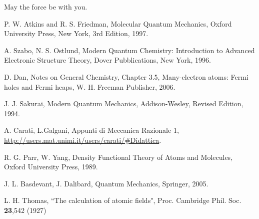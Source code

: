 \documentclass[a4paper,12pt]{article}
\begin{document}
May the force be with you.



\clearpage
{}
\begin{thebibliography}{9}


%
%

P. W. Atkins and R. S. Friedman,
Molecular Quantum Mechanics,
Oxford University Press, New York,
3rd Edition,
1997.

A. Szabo, N. S. Ostlund,
Modern Quantum Chemistry: Introduction to Advanced Electronic Structure Theory,
Dover Pubblications, New York,
1996.

D. Dan, Notes on General Chemistry,
Chapter 3.5, Many-electron atoms: Fermi holes and Fermi heaps,
W. H. Freeman Publisher,
2006.

J. J. Sakurai,
Modern Quantum Mechanics,
Addison-Wesley,
Revised Edition,
1994.

A. Carati, L.Galgani,
Appunti di Meccanica Razionale 1,
\url{http://users.mat.unimi.it/users/carati/#Didattica}.

R. G. Parr, W. Yang,
Density Functional Theory of Atoms and Molecules,
Oxford University Press,
1989.

J. L. Basdevant, J. Dalibard,
Quantum Mechanics,
Springer,
2005.


L. H. Thomas, ``The calculation of atomic fields", Proc. Cambridge Phil. Soc. \textbf{23},542 (1927)


\end{thebibliography}
\end{document}
